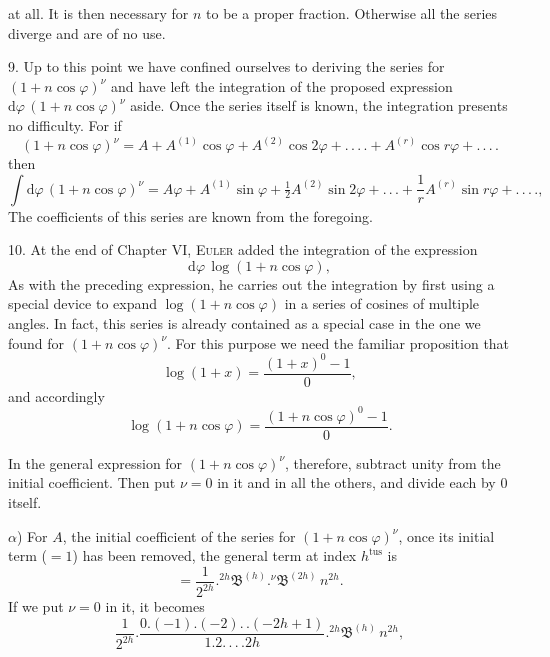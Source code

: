 at all. It is then necessary for $n$ to be a proper fraction. Otherwise
all the series diverge and are of no use.

9. Up to this point we have confined ourselves to deriving the series for $(1+n\cos\varphi)^{\nu}$ and have left the integration of
the proposed expression $\mathrm{d}\varphi\,(1+n\cos\varphi)^{\nu}$ aside. Once the series itself is known, the integration
presents no difficulty. For if
\[
(1+n\cos\varphi)^{\nu} = A + A^{(1)}\cos\varphi + A^{(2)}\cos 2\varphi + .\,.\,.\,. + A^{(r)}\cos r\varphi + .\,.\,.\,.
\]
then
\[
\int \mathrm{d}\varphi\,(1+n\cos\varphi)^{\nu} = A\varphi + A^{(1)}\sin\varphi + \tfrac{1}{2}A^{(2)}\sin 2\varphi + .\,.\,. + \frac{1}{r}A^{(r)}\sin r\varphi + .\,.\,.\,.,
\]
The coefficients of this series are known from the foregoing.

10. At the end of Chapter VI, \textsc{Euler} added the integration of the expression
\[
\mathrm{d}\varphi\,\log(1+n\cos\varphi),
\]
As with the preceding expression, he carries out the integration by first using a special device to expand $\log(1+n\cos\varphi)$ in a series
of cosines of multiple angles. In fact,
this series is already contained as a special case in the one we found for $(1+n\cos\varphi)^{\nu}$.
For this purpose we need the familiar proposition that
\[
\log(1+x) = \frac{(1+x)^{0}-1}{0},
\]
and accordingly
\[
\log(1+n\cos\varphi) = \frac{(1+n\cos\varphi)^{0}-1}{0}.
\]
\par\noindent\hspace*{\parindent}In the general expression for $(1+n\cos\varphi)^{\nu}$, therefore, subtract unity from the initial coefficient.
Then put $\nu=0$ in it and in all the others, and divide each by $0$ itself.

$\alpha$) For $A$, the initial coefficient of the series for $(1+n\cos\varphi)^{\nu}$,
once its initial term ($=1$) has been removed, the general term at index $h^{\mathrm{tus}}$ is
\[
= \frac{1}{2^{2h}} . {}^{2h}\mathfrak{B}^{(h)} . {}^{\nu}\mathfrak{B}^{(2h)}\,n^{2h}.
\]
If we put $\nu=0$ in it, it becomes
\[
\frac{1}{2^{2h}} . \frac{0.(-1).(-2).\,.(-2h+1)}{1.2.\,.\,.\,. 2h} . {}^{2h}\mathfrak{B}^{(h)}\,n^{2h},
\]

